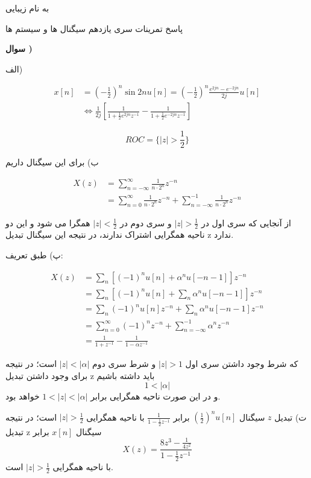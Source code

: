 \documentclass[10pt,letterpaper]{article}
\newcounter{QuestionNumber}
\newcommand{\Q}{
\textbf{
سوال \theQuestionNumber)
}
\stepcounter{QuestionNumber}
}
\newcommand{\qn}[1]{
\[
\begin{split}
#1
\end{split}
\]
}
\begin{document}
\Large
\begin{center}
به نام زیبایی

پاسخ تمرینات سری یازدهم سیگنال ها و سیستم ها

\hrulefill
\end{center}
%
%
%
%
%
%
%
%
%
%
%

\large

\Q

الف)
\qn{
x[n]&=(-\frac{1}{2})^n\sin 2nu[n]
=(-\frac{1}{2})^n\frac{e^{2jn}-e^{-2jn}}{2j}u[n]
\\&\iff
\frac{1}{2j}\left[\frac{1}{1+\frac{1}{2}e^{2jn}z^{-1}}-\frac{1}{1+\frac{1}{2}e^{-2jn}z^{-1}}\right]
}
$$
ROC=\{|z|>\frac{1}{2}\}
$$

ب) برای این سیگنال داریم
\qn{
X(z)&=\sum_{n=-\infty}^\infty \frac{1}{n\cdot 2^n}z^{-n}
\\&=\sum_{n=0}^\infty \frac{1}{n\cdot 2^n}z^{-n}
+
\sum_{n=-\infty}^{-1} \frac{1}{n\cdot 2^n}z^{-n}
}
از آنجایی که سری اول در 
$
|z|>\frac{1}{2}
$
و سری دوم در 
$
|z|<\frac{1}{2}
$
همگرا می شود و این دو ناحیه همگرایی اشتراک ندارند، در نتیجه این سیگنال تبدیل z ندارد.

پ) طبق تعریف:
\qn{
X(z)&=\sum_n \left[(-1)^nu[n]+\alpha^n u[-n-1]\right]z^{-n}
\\&=\sum_n \left[(-1)^nu[n]+\sum_n \alpha^n u[-n-1]\right]z^{-n}
\\&=\sum_n (-1)^nu[n]z^{-n}+\sum_n \alpha^n u[-n-1]z^{-n}
\\&=\sum_{n=0}^\infty (-1)^nz^{-n}+\sum_{n=-\infty}^{-1} \alpha^n z^{-n}
\\&=\frac{1}{1+z^{-1}}-\frac{1}{1-\alpha z^{-1}}
}
که شرط وجود داشتن سری اول 
$
|z|>1
$
و شرط سری دوم 
$
|z|<|\alpha|
$
است؛ در نتیجه برای وجود داشتن تبدیل z باید داشته باشیم
$$
1<|\alpha|
$$
و در این صورت ناحیه همگرایی برابر 
$
1<|z|<|\alpha|
$
خواهد بود.

ت) تبدیل $z$ سیگنال 
$
(\frac{1}{2})^nu[n]
$
برابر
$
\frac{1}{1-\frac{1}{2}z^{-1}}
$
با ناحیه همگرایی
$
|z|>\frac{1}{2}
$
است؛ در نتیجه تبدیل z سیگنال 
$
x[n]
$
برابر
$$
X(z)=\frac{8z^3-\frac{1}{4z^2}}{1-\frac{1}{2}z^{-1}}
$$
با ناحیه همگرایی
$
|z|>\frac{1}{2}
$
است.
\end{document}
